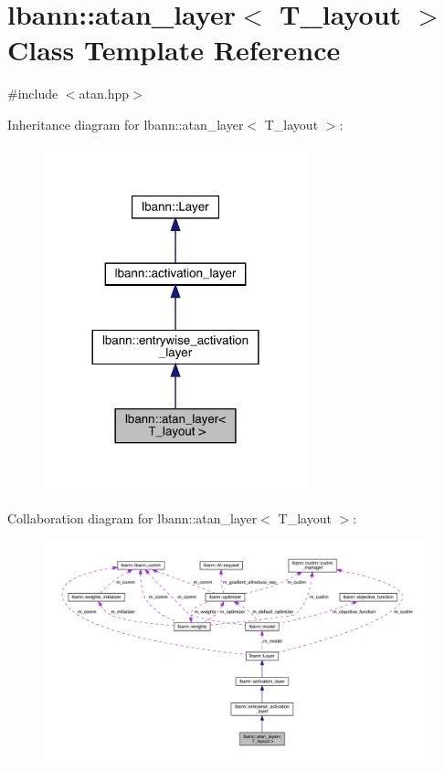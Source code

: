 \hypertarget{classlbann_1_1atan__layer}{}\section{lbann\+:\+:atan\+\_\+layer$<$ T\+\_\+layout $>$ Class Template Reference}
\label{classlbann_1_1atan__layer}


{\ttfamily \#include $<$atan.\+hpp$>$}



Inheritance diagram for lbann\+:\+:atan\+\_\+layer$<$ T\+\_\+layout $>$\+:\nopagebreak
\begin{figure}[H]
\begin{center}
\leavevmode
\includegraphics[width=216pt]{classlbann_1_1atan__layer__inherit__graph}
\end{center}
\end{figure}


Collaboration diagram for lbann\+:\+:atan\+\_\+layer$<$ T\+\_\+layout $>$\+:\nopagebreak
\begin{figure}[H]
\begin{center}
\leavevmode
\includegraphics[width=350pt]{classlbann_1_1atan__layer__coll__graph}
\end{center}
\end{figure}
